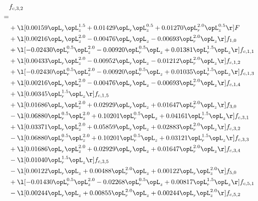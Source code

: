 \begin{alignat}{2} 
\label{eq:f_32_1} 
& f_{c,3,2} \nonumber \\ 
 = \\ 
& + \l[  0.00159 \opL_r \opL_z^{1.5} +  0.01429 \opL_r \opL_z^{0.5} +  0.01270 \opL_r^{2.0} \opL_z^{0.5}  \r] F \nonumber \\ 
& + \l[  0.00216 \opL_r \opL_z^{2.0}   -0.00476 \opL_r \opL_z   -0.00693 \opL_r^{2.0} \opL_z  \r] f_{1,0} \nonumber \\ 
& + \l[  -0.02430 \opL_r^{0.5} \opL_z^{2.0}   -0.00920 \opL_r^{0.5} \opL_z +  0.01381 \opL_r^{1.5} \opL_z  \r] f_{c,1,1} \nonumber \\ 
& + \l[  0.00433 \opL_r \opL_z^{2.0}   -0.00952 \opL_r \opL_z   -0.01212 \opL_r^{2.0} \opL_z  \r] f_{c,1,2} \nonumber \\ 
& + \l[  -0.02430 \opL_r^{0.5} \opL_z^{2.0}   -0.00920 \opL_r^{0.5} \opL_z +  0.01035 \opL_r^{1.5} \opL_z  \r] f_{c,1,3} \nonumber \\ 
& + \l[  0.00216 \opL_r \opL_z^{2.0}   -0.00476 \opL_r \opL_z   -0.00693 \opL_r^{2.0} \opL_z  \r] f_{c,1,4} \nonumber \\ 
& + \l[  0.00345 \opL_r^{1.5} \opL_z  \r] f_{c,1,5} \nonumber \\ 
& + \l[  0.01686 \opL_r \opL_z^{2.0} +  0.02929 \opL_r \opL_z +  0.01647 \opL_r^{2.0} \opL_z  \r] f_{3,0} \nonumber \\ 
& - \l[  0.06880 \opL_r^{0.5} \opL_z^{2.0} +  0.10201 \opL_r^{0.5} \opL_z +  0.04161 \opL_r^{1.5} \opL_z  \r] f_{c,3,1} \nonumber \\ 
& + \l[  0.03371 \opL_r \opL_z^{2.0} +  0.05859 \opL_r \opL_z +  0.02883 \opL_r^{2.0} \opL_z  \r] f_{c,3,2} \nonumber \\ 
& - \l[  0.06880 \opL_r^{0.5} \opL_z^{2.0} +  0.10201 \opL_r^{0.5} \opL_z +  0.03121 \opL_r^{1.5} \opL_z  \r] f_{c,3,3} \nonumber \\ 
& + \l[  0.01686 \opL_r \opL_z^{2.0} +  0.02929 \opL_r \opL_z +  0.01647 \opL_r^{2.0} \opL_z  \r] f_{c,3,4} \nonumber \\ 
& - \l[  0.01040 \opL_r^{1.5} \opL_z  \r] f_{c,3,5} \nonumber \\ 
& - \l[  0.00122 \opL_r \opL_z +  0.00488 \opL_r^{2.0} \opL_z +  0.00122 \opL_r \opL_z^{2.0}  \r] f_{5,0} \nonumber \\ 
& + \l[  -0.01430 \opL_r^{0.5} \opL_z^{2.0}   -0.02268 \opL_r^{0.5} \opL_z +  0.00817 \opL_r^{1.5} \opL_z  \r] f_{c,5,1} \nonumber \\ 
& - \l[  0.00244 \opL_r \opL_z +  0.00855 \opL_r^{2.0} \opL_z +  0.00244 \opL_r \opL_z^{2.0}  \r] f_{c,5,2} \nonumber \\ 

\end{alignat}
